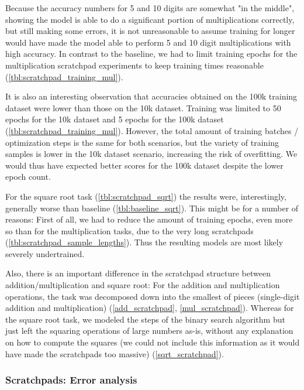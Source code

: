 Because the accuracy numbers for 5 and 10 digits are somewhat "in the middle", showing the model is able to do a significant portion of multiplications correctly, but still making some errors, it is not unreasonable to assume training for longer would have made the model able to perform 5 and 10 digit multiplications with high accuracy. In contrast to the baseline, we had to limit training epochs for the multiplication scratchpad experiments to keep training times reasonable (\cref{tbl:scratchpad_training_mul}).

It is also an interesting observation that accuracies obtained on the 100k training dataset were lower than those on the 10k dataset. Training was limited to 50 epochs for the 10k dataset and 5 epochs for the 100k dataset (\cref{tbl:scratchpad_training_mul}). However, the total amount of training batches / optimization steps is the same for both scenarios, but the variety of training samples is lower in the 10k dataset scenario, increasing the risk of overfitting.
We would thus have expected better scores for the 100k dataset despite the lower epoch count.


For the square root task (\cref{tbl:scratchpad_sqrt}) the results were, interestingly, generally worse than baseline (\cref{tbl:baseline_sqrt}). This might be for a number of reasons:
First of all, we had to reduce the amount of training epochs, even more so than for the multiplication tasks, due to the very long scratchpads (\cref{tbl:scratchpad_sample_lengths}). Thus the resulting models are most likely severely undertrained.

Also, there is an important difference in the scratchpad structure between addition/multiplication and square root: For the addition and multiplication operations, the task was decomposed down into the smallest of pieces (single-digit addition and multiplication) (\cref{add_scratchpad}, \cref{mul_scratchpad}). Whereas for the square root task, we modeled the steps of the binary search algorithm but just left the squaring operations of large numbers as-is, without any explanation on how to compute the squares (we could not include this information as it would have made the scratchpads too massive) (\cref{sqrt_scratchpad}).

\subsubsection{Scratchpads: Error analysis}

